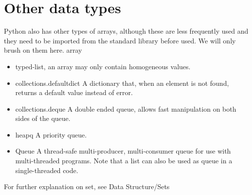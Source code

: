 \section{Other data types}
Python also has other types of arrays, although these are less frequently used
and they need to be imported from the standard library before used. We will only
brush on them here.  array
\begin{itemize}
	\item typed-list, an array may only contain homogeneous values.
	\item collections.defaultdict A dictionary that, when an element is not
found, returns a default value instead of error.
	\item collections.deque A double ended queue, allows fast manipulation on
both sides of the queue.
	\item heapq A priority queue.
\item Queue A thread-safe multi-producer, multi-consumer queue for use with
multi-threaded programs. Note that a list can also be used as queue in a
single-threaded code.
\end{itemize}

For further explanation on set, see Data Structure/Sets
